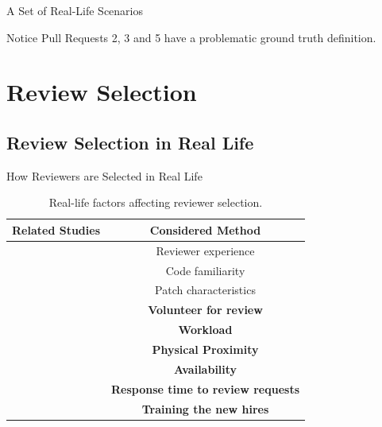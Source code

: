 \documentclass{beamer}
\begin{document}
\begin{frame}{A Set of Real-Life Scenarios}
\begin{table}[h!]
\end{table}

\begin{block}{Notice}
Pull Requests 2, 3 and 5 have a problematic ground truth definition.
\end{block}


\end{frame}
%


\section{Review Selection}
\subsection{Review Selection in Real Life}
    \begin{frame}{How Reviewers are Selected in Real Life}
\begin{table}
\centering
\begin{tabular}{c|c}
Related Studies & Considered Method \\\hline
\cite{kovalenko2018does,ruangwan2019impact,kononenko2015investigating} & Reviewer experience \\
\cite{kovalenko2018does,macleod2017code} & Code familiarity  \\
\cite{ruangwan2019impact,kononenko2015investigating} & Patch characteristics \\
\textbf{\cite{kovalenko2018does,macleod2017code}} & \textbf{Volunteer for review} \\
\textbf{\cite{kovalenko2018does,ruangwan2019impact}} & \textbf{Workload} \\
\textbf{\cite{kovalenko2018does}} & \textbf{Physical Proximity} \\
\textbf{\cite{kovalenko2018does}} & \textbf{Availability}  \\
\textbf{\cite{kovalenko2018does}} & \textbf{Response time to review requests} \\
\textbf{\cite{macleod2017code}} & \textbf{Training the new hires} 

\end{tabular}
\caption{\label{tab:widgets} Real-life factors affecting reviewer selection.}
\end{table}

\end{frame}
%
%
%
\end{document}

